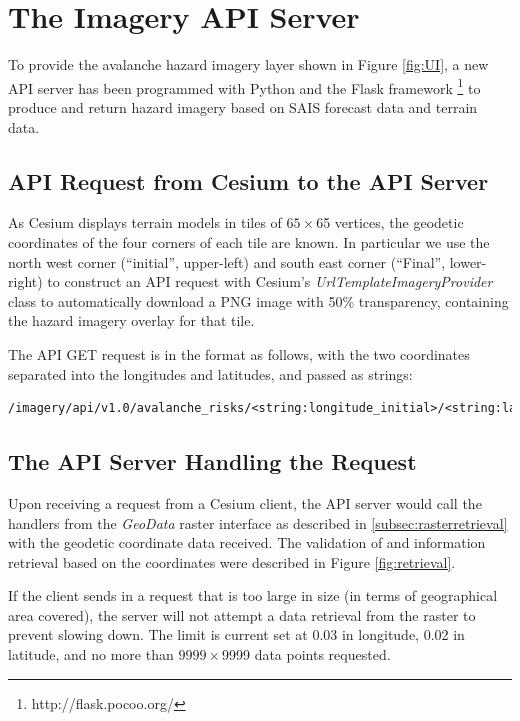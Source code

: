 \documentclass[11pt, oneside]{article}
\begin{document}
{\section{The Imagery API Server} \label{sec:APIServer}
	
	To provide the avalanche hazard imagery layer shown in Figure \ref{fig:UI}, a new API server has been programmed with Python and the Flask framework \footnote{http://flask.pocoo.org/} to produce and return hazard imagery based on SAIS forecast data and terrain data.
	
	\subsection{API Request from Cesium to the API Server}
		As Cesium displays terrain models in tiles of $65 \times $65 vertices, the geodetic coordinates of the four corners of each tile are known. In particular we use the north west corner (``initial'', upper-left) and south east corner (``Final'', lower-right) to construct an API request with Cesium's \textit{UrlTemplateImageryProvider} \cite{urltemplate} class to automatically download a PNG image with 50\% transparency, containing the hazard imagery overlay for that tile.
		
		The API GET request is in the format as follows, with the two coordinates separated into the longitudes and latitudes, and passed as strings:
		\begin{lstlisting}[breaklines]
/imagery/api/v1.0/avalanche_risks/<string:longitude_initial>/<string:latitude_initial>/<string:longitude_final>/<string:latitude_final>
		\end{lstlisting}
	
	\subsection{The API Server Handling the Request}
		Upon receiving a request from a Cesium client, the API server would call the handlers from the \textit{GeoData} raster interface as described in \ref{subsec:rasterretrieval} with the geodetic coordinate data received. The validation of and information retrieval based on the coordinates were described in Figure \ref{fig:retrieval}.
		
		If the client sends in a request that is too large in size (in terms of geographical area covered), the server will not attempt a data retrieval from the raster to prevent slowing down. The limit is current set at 0.03 in longitude, 0.02 in latitude, and no more than $9999 \times $9999 data points requested. 
		
}
\end{document}
